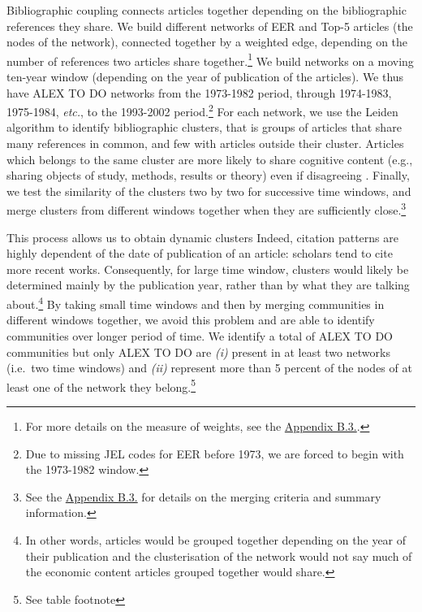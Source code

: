 \documentclass[]{elsarticle} %
\begin{document}
Bibliographic coupling connects articles together depending on the
bibliographic references they share. We build different networks of EER
and Top-5 articles (the nodes of the network), connected together by a
weighted edge, depending on the number of references two articles share
together.\footnote{For more details on the measure of weights, see the
  \protect\hyperlink{network}{Appendix B.3.}.} We build networks on a
moving ten-year window (depending on the year of publication of the
articles). We thus have ALEX TO DO networks from the 1973-1982 period,
through 1974-1983, 1975-1984, \emph{etc.}, to the 1993-2002
period.\footnote{Due to missing JEL codes for EER before 1973, we are
  forced to begin with the 1973-1982 window.} For each network, we use
the Leiden algorithm \citep{traag2019} to identify bibliographic
clusters, that is groups of articles that share many references in
common, and few with articles outside their cluster. Articles which
belongs to the same cluster are more likely to share cognitive content
(e.g., sharing objects of study, methods, results or theory) even if
disagreeing \citep{claveau2016, truc2021, goutsmedt2021}. Finally, we
test the similarity of the clusters two by two for successive time
windows, and merge clusters from different windows together when they
are sufficiently close.\footnote{See the
  \protect\hyperlink{network}{Appendix B.3.} for details on the merging
  criteria and summary information.}

This process allows us to obtain dynamic clusters Indeed, citation
patterns are highly dependent of the date of publication of an article:
scholars tend to cite more recent works. Consequently, for large time
window, clusters would likely be determined mainly by the publication
year, rather than by what they are talking about.\footnote{In other
  words, articles would be grouped together depending on the year of
  their publication and the clusterisation of the network would not say
  much of the economic content articles grouped together would share.}
By taking small time windows and then by merging communities in
different windows together, we avoid this problem and are able to
identify communities over longer period of time. We identify a total of
ALEX TO DO communities but only ALEX TO DO are \emph{(i)} present in at
least two networks (i.e.~two time windows) and \emph{(ii)} represent
more than 5 percent of the nodes of at least one of the network they
belong.\footnote{See table footnote}
\end{document}
